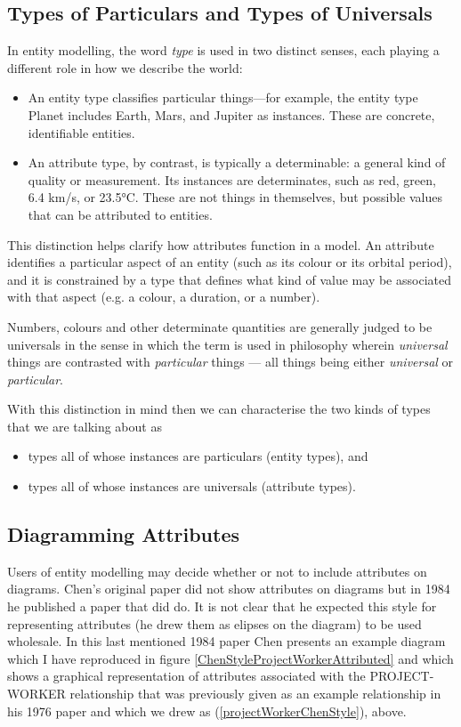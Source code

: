 \subsection{Types of Particulars and Types of Universals}
In entity modelling, the word \textit{type} is used in two distinct senses, each playing a different role in how we describe the world:
\begin{itemize}
\item An entity type classifies particular things—for example, the entity type Planet includes Earth, Mars, and Jupiter as instances. These are concrete, identifiable entities.
\item An attribute type, by contrast, is typically a determinable: a general kind of quality or measurement. Its instances are determinates, such as red, green, 6.4 km/s, or 23.5°C. These are not things in themselves, but possible values that can be attributed to entities.
\end{itemize}
This distinction helps clarify how attributes function in a model. An attribute identifies a particular aspect of an entity (such as its colour or its orbital period), and it is constrained by a type that defines what kind of value may be associated with that aspect (e.g. a colour, a duration, or a number).

Numbers, colours and  other determinate quantities are generally judged to be universals in the sense in which the term  is used in philosophy wherein
 \textit{universal} things are contrasted with \textit{particular} things --- all things being either \textit{universal} or \textit{particular}.

With this distinction in mind then we can characterise 
the two kinds of types that we are talking about as
\begin{itemize}
\item types all of whose instances are particulars (entity types), and
\item types all of whose instances are universals (attribute types).  
\end{itemize} 

\subsection*{Diagramming Attributes}
\mynote
Users of entity modelling may decide whether or not to include attributes on diagrams. Chen's original paper did not show attributes on diagrams  but in 1984
he published a paper that did do. 
It is not clear that he expected this style for representing attributes (he drew them as elipses on the diagram) to be used wholesale. 
\mynote
In this last mentioned 1984 paper Chen presents an example diagram 
which I have reproduced in figure  \ref{ChenStyleProjectWorkerAttributed} 
and which shows a graphical representation of attributes associated with the PROJECT-WORKER relationship  that was previously given as an example relationship in his 1976 paper and which we drew as (\ref{projectWorkerChenStyle}), above.

